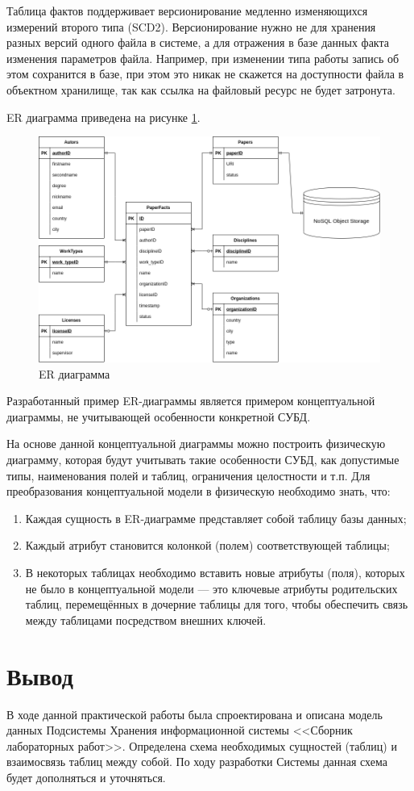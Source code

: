 \documentclass[a4paper,14pt]{extarticle}
\begin{document}
Таблица фактов поддерживает версионирование медленно изменяющихся измерений второго типа (SCD2). Версионирование нужно не для хранения разных версий одного файла в системе, а для отражения в базе данных факта изменения параметров файла. Например, при изменении типа работы запись об этом сохранится в базе, при этом это никак не скажется на доступности файла в объектном хранилище, так как ссылка на файловый ресурс не будет затронута.

ER диаграмма приведена на рисунке \ref{fig:data-model}.

\begin{figure}[h!]
	\centering
	\includegraphics[width=0.8\linewidth]{images/data-model}
	\caption{ER диаграмма}
	\label{fig:data-model}
\end{figure}





Разработанный пример ER-диаграммы является примером
концептуальной диаграммы, не учитывающей особенности конкретной
СУБД. 

На основе данной концептуальной диаграммы можно построить
физическую диаграмму, которая будут учитывать такие особенности СУБД,
как допустимые типы, наименования полей и таблиц, ограничения
целостности и т.п.
Для преобразования концептуальной модели в физическую необходимо
знать, что:
\begin{enumerate}
	\item Каждая сущность в ER-диаграмме представляет собой таблицу
	базы данных;
	\item Каждый атрибут становится колонкой (полем) соответствующей
	таблицы;
	\item  В некоторых таблицах необходимо вставить новые атрибуты
	(поля), которых не было в концептуальной модели — это ключевые атрибуты 
	родительских таблиц, перемещённых в дочерние таблицы для того, чтобы
	обеспечить связь между таблицами посредством внешних ключей.
\end{enumerate}

\section*{Вывод}

В ходе данной практической работы была спроектирована и описана модель данных Подсистемы Хранения информационной системы <<Сборник лабораторных работ>>. Определена схема необходимых сущностей (таблиц) и взаимосвязь таблиц между собой. По ходу разработки Системы данная схема будет дополняться и уточняться.
\end{document}
